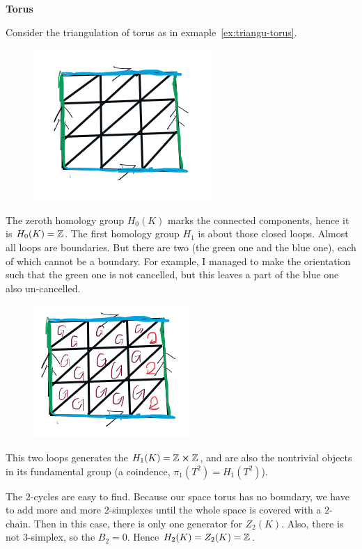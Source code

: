 \begin{ex}\textbf{Torus}

    Consider the triangulation of torus as in
    exmaple~\ref{ex:triangu-torus}.
    \begin{figure}[H]
        \centering
        \includegraphics[width=0.6\linewidth]{pics/ch8/torus-tri.png}
    \end{figure}

    The zeroth homology group $H_0(K)$ marks the connected components,
    hence it is $H_0(K)=\mathbb{Z}$. The first homology group $H_1$ is about
    those closed loops. Almost all loops are boundaries. But there are
    two (the green one and the blue one), each of which cannot be a
    boundary. For example, I managed to make the orientation such that
    the green one is not cancelled, but this leaves a part of the blue
    one also un-cancelled. 
    \begin{figure}[H]
        \centering
        \includegraphics[width=0.6\linewidth]{pics/ch8/torus-tri-1.png}
    \end{figure}
    
    This two loops generates the $H_1(K)=\mathbb{Z}\cross\mathbb{Z}$, and are also the
    nontrivial objects in its fundamental group (a coindence,
    $\pi_1(T^2)=H_1(T^2)$).

    The $2$-cycles are easy to find. Because our space torus has no
    boundary, we have to add more and more $2$-simplexes until the
    whole space is covered with a $2$-chain. Then in this case, there
    is only one generator for $Z_2(K)$. Also, there is not
    $3$-simplex, so the $B_2=0$. Hence $H_2(K)=Z_2(K)=\mathbb{Z}$.
\end{ex}

